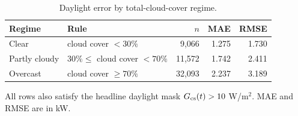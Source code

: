 \begin{table}[!t]
\caption{Daylight error by total-cloud-cover regime.}
\label{tab:weather_regime_summary}
\centering
\scriptsize
\begin{tabularx}{\columnwidth}{@{}l>{\raggedright\arraybackslash}Xrrr@{}}
\toprule
Regime & Rule & $n$ & MAE & RMSE \\
\midrule
Clear & cloud cover $<30\%$ & 9,066 & 1.275 & 1.730 \\
Partly cloudy & $30\%\leq$ cloud cover $<70\%$ & 11,572 & 1.742 & 2.411 \\
Overcast & cloud cover $\geq70\%$ & 32,093 & 2.237 & 3.189 \\
\bottomrule
\end{tabularx}
\vspace{2pt}
\raggedright\footnotesize{All rows also satisfy the headline daylight mask $G_{\mathrm{cs}}(t)>10$ W/m$^2$. MAE and RMSE are in kW.}
\end{table}
